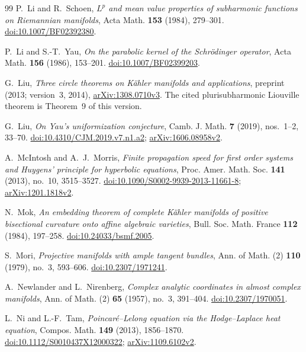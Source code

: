 \begin{thebibliography}{99}
P.~Li and R.~Schoen,
\emph{$L^p$ and mean value properties of subharmonic functions on
Riemannian manifolds},
Acta Math. \textbf{153} (1984), 279--301.
\href{https://doi.org/10.1007/BF02392380}{doi:10.1007/BF02392380}.

P.~Li and S.-T.~Yau,
\emph{On the parabolic kernel of the Schr\"odinger operator},
Acta Math. \textbf{156} (1986), 153--201.
\href{https://doi.org/10.1007/BF02399203}{doi:10.1007/BF02399203}.

G.~Liu,
\emph{Three circle theorems on K\"ahler manifolds and applications},
preprint (2013; version~3, 2014),
\href{https://arxiv.org/abs/1308.0710v3}{arXiv:1308.0710v3}.
The cited plurisubharmonic Liouville theorem is Theorem~9 of this version.

G.~Liu,
\emph{On Yau's uniformization conjecture},
Camb. J. Math. \textbf{7} (2019), nos.~1--2, 33--70.
\href{https://doi.org/10.4310/CJM.2019.v7.n1.a2}
{doi:10.4310/CJM.2019.v7.n1.a2};
\href{https://arxiv.org/abs/1606.08958v2}{arXiv:1606.08958v2}.

A.~McIntosh and A.~J.~Morris,
\emph{Finite propagation speed for first order systems and Huygens'
principle for hyperbolic equations},
Proc. Amer. Math. Soc. \textbf{141} (2013), no.~10, 3515--3527.
\href{https://doi.org/10.1090/S0002-9939-2013-11661-8}
{doi:10.1090/S0002-9939-2013-11661-8};
\href{https://arxiv.org/abs/1201.1818v2}{arXiv:1201.1818v2}.

N.~Mok,
\emph{An embedding theorem of complete K\"ahler manifolds of positive
bisectional curvature onto affine algebraic varieties},
Bull. Soc. Math. France \textbf{112} (1984), 197--258.
\href{https://doi.org/10.24033/bsmf.2005}{doi:10.24033/bsmf.2005}.

S.~Mori,
\emph{Projective manifolds with ample tangent bundles},
Ann. of Math. (2) \textbf{110} (1979), no.~3, 593--606.
\href{https://doi.org/10.2307/1971241}{doi:10.2307/1971241}.

A.~Newlander and L.~Nirenberg,
\emph{Complex analytic coordinates in almost complex manifolds},
Ann. of Math. (2) \textbf{65} (1957), no.~3, 391--404.
\href{https://doi.org/10.2307/1970051}{doi:10.2307/1970051}.

L.~Ni and L.-F.~Tam,
\emph{Poincar\'e--Lelong equation via the Hodge--Laplace heat equation},
Compos. Math. \textbf{149} (2013), 1856--1870.
\href{https://doi.org/10.1112/S0010437X12000322}
{doi:10.1112/S0010437X12000322};
\href{https://arxiv.org/abs/1109.6102v2}{arXiv:1109.6102v2}.


\end{thebibliography}
